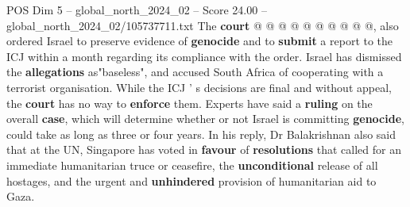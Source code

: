 \begin{textsample}{POS Dim 5 – global\_north\_2024\_02 – Score 24.00 – global\_north\_2024\_02/105737711.txt}
The \textbf{court} @ @ @ @ @ @ @ @ @ @, also ordered Israel to preserve evidence of \textbf{genocide} and to \textbf{submit} a report to the ICJ within a month regarding its compliance with the order.
Israel has dismissed the \textbf{allegations} as"baseless", and accused South Africa of cooperating with a terrorist organisation.
While the ICJ ' s decisions are final and without appeal, the \textbf{court} has no way to \textbf{enforce} them.
Experts have said a \textbf{ruling} on the overall \textbf{case}, which will determine whether or not Israel is committing \textbf{genocide}, could take as long as three or four years.
In his reply, Dr Balakrishnan also said that at the UN, Singapore has voted in \textbf{favour} of \textbf{resolutions} that called for an immediate humanitarian truce or ceasefire, the \textbf{unconditional} release of all hostages, and the urgent and \textbf{unhindered} provision of humanitarian aid to Gaza.

\end{textsample}
